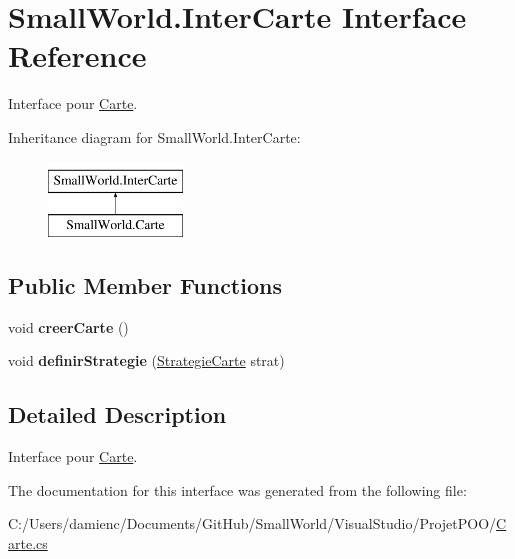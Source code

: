 \hypertarget{interface_small_world_1_1_inter_carte}{\section{Small\-World.\-Inter\-Carte Interface Reference}
\label{interface_small_world_1_1_inter_carte}
}


Interface pour \hyperlink{class_small_world_1_1_carte}{Carte}.  


Inheritance diagram for Small\-World.\-Inter\-Carte\-:\begin{figure}[H]
\begin{center}
\leavevmode
\includegraphics[height=2.000000cm]{interface_small_world_1_1_inter_carte}
\end{center}
\end{figure}
\subsection*{Public Member Functions}
\begin{DoxyCompactItemize}
\item 
\hypertarget{interface_small_world_1_1_inter_carte_aa74e8d2a86277fdd29fcf2529020f205}{void {\bfseries creer\-Carte} ()}\label{interface_small_world_1_1_inter_carte_aa74e8d2a86277fdd29fcf2529020f205}

\item 
\hypertarget{interface_small_world_1_1_inter_carte_a8815584cd7ccacfb3e91436189606830}{void {\bfseries definir\-Strategie} (\hyperlink{class_small_world_1_1_strategie_carte}{Strategie\-Carte} strat)}\label{interface_small_world_1_1_inter_carte_a8815584cd7ccacfb3e91436189606830}

\end{DoxyCompactItemize}


\subsection{Detailed Description}
Interface pour \hyperlink{class_small_world_1_1_carte}{Carte}. 

The documentation for this interface was generated from the following file\-:\begin{DoxyCompactItemize}
\item 
C\-:/\-Users/damienc/\-Documents/\-Git\-Hub/\-Small\-World/\-Visual\-Studio/\-Projet\-P\-O\-O/\hyperlink{_carte_8cs}{Carte.\-cs}\end{DoxyCompactItemize}
